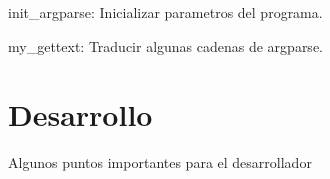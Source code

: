 \documentclass[a4paper,12pt,spanish]{sphinxmanual}
\begin{document}
\begin{fulllineitems}
\label{\detokenize{readoermdb:readoermdb.init_argparse}}
init\_argparse: Inicializar parametros del programa.

\end{fulllineitems}


\begin{fulllineitems}
\label{\detokenize{readoermdb:readoermdb.my_gettext}}
my\_gettext: Traducir algunas cadenas de argparse.

\end{fulllineitems}



\chapter{Desarrollo}
\label{\detokenize{index:desarrollo}}
Algunos puntos importantes para el desarrollador
\end{document}

